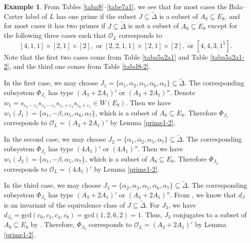 \documentclass[reqno,12pt]{amsart}
\numberwithin{equation}{section}
\theoremstyle{plain}
\theoremstyle{definition}
\newtheorem{ex}[Thm]{Example}
\newcommand{\ep}{\varepsilon}
\renewcommand{\subset}{\subseteq}
\begin{document}
\begin{ex}


  From Tables \ref{taba8}--\ref{tabe7a1}, we see that for most cases the Bala--Carter label of $L$ has one prime if the subset $J\subset \tilde{\Delta}$ is a subset of $A_8\subset E_8$, and for most cases it has two primes if $J\subset \tilde{\Delta}$ is not a subset of $A_8\subset E_8$ except for the following three cases such that $\mathcal{O}_{L}$ corresponds to $$[4,1,1]\times [2,1]\times [2], \text{~or~} [2,2,1,1]\times [2,1]\times [2], \text{~or~}[4,4,3,1^5].$$
  Note that the first two cases come from Table \ref{taba5a2a1} and Table \ref{taba5a2a1-2}, and the third one comes from Table \ref{tabd8-2}. 
  
  In the first case, we may choose $J_1=\{\alpha_1,\alpha_2, \alpha_5,\alpha_6,\alpha_7\}\subset \tilde{\Delta}$. The corresponding subsystem $\Phi_{J_1}$ has type $(A_3+2A_1)'$ or $(A_3+2A_1)''$. 
  Denote $w_1=s_{\ep_2-\ep_1}s_{\ep_8-\ep_7}s_{\ep_7+\ep_2}s_{\ep_8+\ep_1}\in W(E_8)$. Then we have $w_1(J_1)=\{\alpha_1,-\beta, \alpha_5,\alpha_6,\alpha_7\}$, which is a subset of $A_8\subset E_8$. Therefore $\Phi_{J_1}$ corresponds to 
  $\mathcal{O}_{L}=(A_3+2A_1)'$ by Lemma \ref{prime1-2}.
  
  
  In the second case, we may choose $J_2=\{\alpha_1,\alpha_2, \alpha_5,\alpha_7\}\subset \tilde{\Delta}$. The corresponding subsystem $\Phi_{J_2}$ has type $(4A_1)'$ or $(4A_1)''$. 
  Then we have $w_1(J_2)=\{\alpha_1,-\beta, \alpha_5,\alpha_7\}$, which is a subset of $A_8\subset E_8$. Therefore $\Phi_{J_2}$ corresponds to 
  $\mathcal{O}_{L}=(4A_1)'$ by Lemma \ref{prime1-2}.
  
  
 In the third case, we may choose $J_3=\{\alpha_2, \alpha_3,\alpha_5,\alpha_6, \alpha_7\}\subset \tilde{\Delta}$. The corresponding subsystem $\Phi_{J_3}$ has type $(A_3+2A_1)'$ or $(A_3+2A_1)''$. 
 From \cite[\S 2.2]{som-98}, we know that $d_J$ is an invariant of the equivalence class of $J\subset \tilde{\Delta}$. For $J_3$, we have $d_{J_3}=\mathrm{gcd}(c_0,c_1,c_4,c_8)=\mathrm{gcd}(1,2,6,2)=1$. Thus, $J_3$ conjugates to a subset of $A_8\subset E_8$ by \cite[\S 2.2]{som-98}. 
 Therefore, $\Phi_{J_3}$ corresponds to $\mathcal{O}_{L}=(A_3+2A_1)'$ by Lemma \ref{prime1-2}.
 
 

   
\end{ex}
\end{document}
